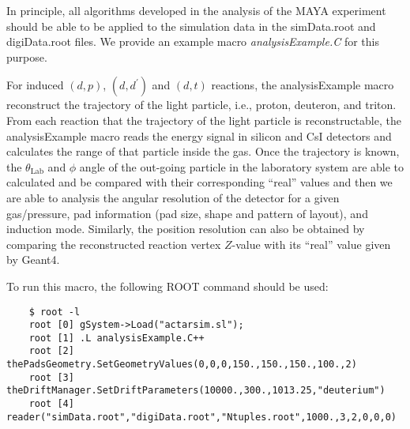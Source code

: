 In principle, all algorithms developed in the analysis of the MAYA experiment should be able to be applied to the simulation data in the simData.root and digiData.root files. We provide an example macro \textit{analysisExample.C} for this purpose.

For  induced $(d,p)$, $(d,d^\prime)$ and $(d,t)$ reactions, the analysisExample macro reconstruct the trajectory of the light particle, i.e., proton, deuteron, and triton. From each reaction that the trajectory of the light particle is reconstructable, the analysisExample macro reads the energy signal in silicon and CsI detectors and calculates the range  of that particle inside the gas. Once the trajectory is known, the $\theta_\text{Lab}$ and $\phi$ angle of the out-going particle in the laboratory system are able to calculated and be compared with their corresponding ``real'' values and then we are able to analysis the angular resolution of the detector for a given gas/pressure, pad information (pad size, shape and pattern of layout), and induction mode. Similarly, the position resolution can also be obtained by comparing the reconstructed reaction vertex $Z$-value with its ``real'' value given by Geant4.

To run this macro, the following ROOT command should be used:
\begin{verbatim}
    $ root -l
    root [0] gSystem->Load("actarsim.sl");
    root [1] .L analysisExample.C++
    root [2] thePadsGeometry.SetGeometryValues(0,0,0,150.,150.,150.,100.,2)
    root [3] theDriftManager.SetDriftParameters(10000.,300.,1013.25,"deuterium")
    root [4] reader("simData.root","digiData.root","Ntuples.root",1000.,3,2,0,0,0)
\end{verbatim}

